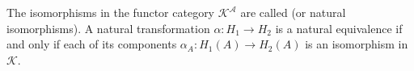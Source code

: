 The isomorphisms in the functor category $\mathcal{K}^\mathcal{A}$ are called  (or natural isomorphisms). A natural transformation $\alpha: H_1 \longrightarrow H_2$ is a natural equivalence if and only if each of its components $\alpha_A: H_1(A) \longrightarrow H_2(A)$ is an isomorphism in $\mathcal{K}$.
